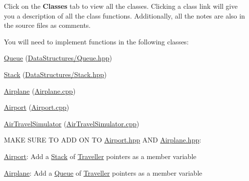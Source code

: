 Click on the {\bfseries Classes} tab to view all the classes. Clicking a class link will give you a description of all the class functions. Additionally, all the notes are also in the source files as comments.

You will need to implement functions in the following classes\+:


\begin{DoxyItemize}
\item \hyperlink{classQueue}{Queue} (\hyperlink{Queue_8hpp}{Data\+Structures/\+Queue.\+hpp})
\item \hyperlink{classStack}{Stack} (\hyperlink{Stack_8hpp}{Data\+Structures/\+Stack.\+hpp})
\item \hyperlink{classAirplane}{Airplane} (\hyperlink{Airplane_8cpp}{Airplane.\+cpp})
\item \hyperlink{classAirport}{Airport} (\hyperlink{Airport_8cpp}{Airport.\+cpp})
\item \hyperlink{classAirTravelSimulator}{Air\+Travel\+Simulator} (\hyperlink{AirTravelSimulator_8cpp}{Air\+Travel\+Simulator.\+cpp})
\end{DoxyItemize}

M\+A\+KE S\+U\+RE TO A\+DD ON TO \hyperlink{Airport_8hpp}{Airport.\+hpp} A\+ND \hyperlink{Airplane_8hpp}{Airplane.\+hpp}\+:


\begin{DoxyItemize}
\item \hyperlink{classAirport}{Airport}\+: Add a \hyperlink{classStack}{Stack} of \hyperlink{structTraveller}{Traveller} pointers as a member variable
\item \hyperlink{classAirplane}{Airplane}\+: Add a \hyperlink{classQueue}{Queue} of \hyperlink{structTraveller}{Traveller} pointers as a member variable 
\end{DoxyItemize}